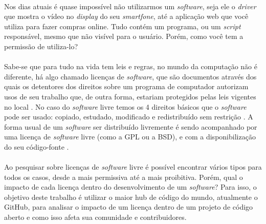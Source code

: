 \paragraph{}
Nos dias atuais é quase impossível não utilizarmos um \textit{software}, seja ele o \textit{driver} que mostra o vídeo no \textit{display} do seu \textit{smartfone}, até a aplicação web que você utiliza para fazer compras online. Tudo contém um programa, ou um \textit{script} responsável, mesmo que não visível para o usuário. Porém, como você tem a permissão de utiliza-lo?

\paragraph{}
Sabe-se que para tudo na vida tem leis e regras, no mundo da computação não é diferente, há algo chamado licenças de \textit{software}, que são documentos através dos quais os detentores dos direitos sobre um programa de computador autorizam usos de seu trabalho que, de outra forma, estariam protegidos pelas leis vigentes no local \cite{sabino2009licenccas}. No caso do \textit{software} livre temos os 4 direitos básicos que o \textit{software} pode ser usado: copiado, estudado, modificado e redistribuído sem restrição \cite{fsf}. A forma usual de um \textit{software} ser distribuído livremente é sendo acompanhado por uma licença de \textit{software} livre (como a GPL ou a BSD), e com a disponibilização do seu código-fonte \cite{campos2006software}.

\paragraph{}
Ao pesquisar sobre licenças de \textit{software} livre é possível encontrar vários tipos para todos os casos, desde a mais permissiva até a mais proibitiva. Porém, qual o impacto de cada licença dentro do desenvolvimento de um \textit{software}? Para isso, o objetivo deste trabalho é utilizar o maior hub de código do mundo, atualmente o GitHub, para analisar o impacto de um licença dentro de um projeto de código aberto e como isso afeta sua comunidade e contribuidores.
